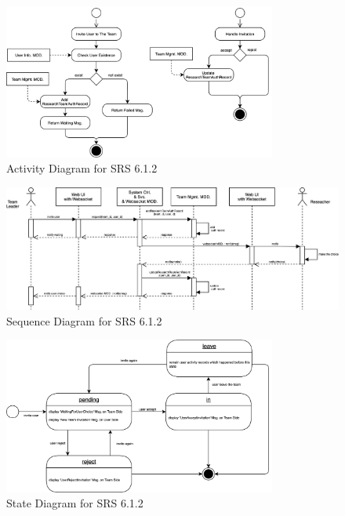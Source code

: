 \begin{figure}[t]
	\centering
	\includegraphics[width=0.8\textwidth]{./img/srs_diagram_6.png}
	\caption{Activity Diagram for SRS 6.1.2}

	\label{fig:srs_diagram_6}
\end{figure}

\begin{figure}[t]
	\centering
	\includegraphics[width=\textwidth]{./img/srs_diagram_7.png}
	\caption{Sequence Diagram for SRS 6.1.2}

	\label{fig:srs_diagram_7}
\end{figure}

\begin{figure}[t]
	\centering
	\includegraphics[width=0.8\textwidth]{./img/srs_diagram_8.png}
	\caption{State Diagram for SRS 6.1.2}

	\label{fig:srs_diagram_8}
\end{figure}
